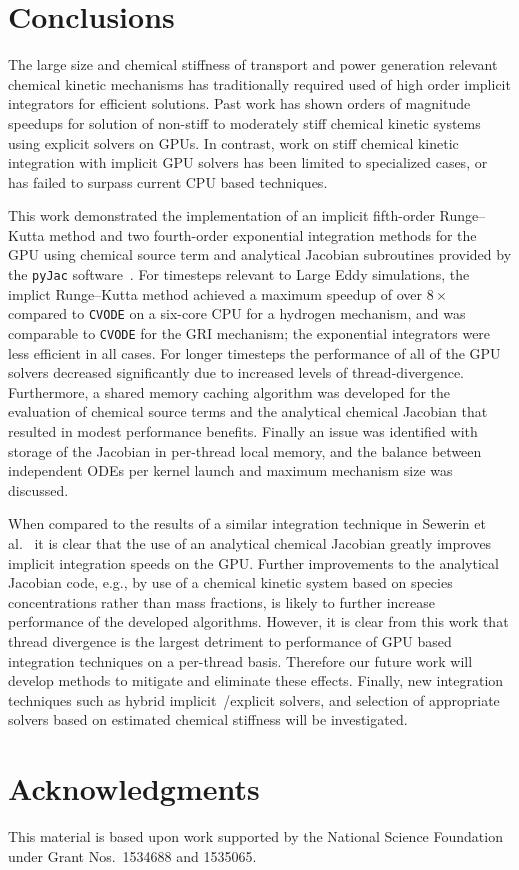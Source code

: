 \documentclass[preprint]{elsarticle}
\begin{document}
\section{Conclusions}

The large size and chemical stiffness of transport and power generation relevant chemical kinetic mechanisms has traditionally required used of high order implicit integrators for efficient solutions.
Past work has shown orders of magnitude speedups for solution of non-stiff to moderately stiff chemical kinetic systems using explicit solvers on GPUs.
In contrast, work on stiff chemical kinetic integration with implicit GPU solvers has been limited to specialized cases, or has failed to surpass current CPU based techniques.

This work demonstrated the implementation of an implicit fifth-order Runge--Kutta method and two fourth-order exponential integration methods for the GPU using chemical source term and analytical Jacobian subroutines provided by the \texttt{pyJac} software~\cite{Niemeyer:2015im}.
For timesteps relevant to Large Eddy simulations, the implict Runge--Kutta method achieved a maximum speedup of over $8 \times$ compared to \texttt{CVODE} on a six-core CPU for a hydrogen mechanism, and was comparable to \texttt{CVODE} for the GRI mechanism; the exponential integrators were less efficient in all cases.
For longer timesteps the performance of all of the GPU solvers decreased significantly due to increased levels of thread-divergence.
Furthermore, a shared memory caching algorithm was developed for the evaluation of chemical source terms and the analytical chemical Jacobian that resulted in modest performance benefits.
Finally an issue was identified with storage of the Jacobian in per-thread local memory, and the balance between independent ODEs per kernel launch and maximum mechanism size was discussed.

When compared to the results of a similar integration technique in Sewerin et al.~\cite{Sewerin20151375} it is clear that the use of an analytical chemical Jacobian greatly improves implicit integration speeds on the GPU.
Further improvements to the analytical Jacobian code, e.g., by use of a chemical kinetic system based on species concentrations rather than mass fractions, is likely to further increase performance of the developed algorithms.
However, it is clear from this work that thread divergence is the largest detriment to performance of GPU based integration techniques on a per-thread basis.
Therefore our future work will develop methods to mitigate and eliminate these effects.
Finally, new integration techniques such as hybrid implicit~\slash explicit solvers, and selection of appropriate solvers based on estimated chemical stiffness will be investigated.


\section*{Acknowledgments}

This material is based upon work supported by the National Science Foundation under Grant Nos.~1534688 and 1535065.


\pagebreak



\end{document}
